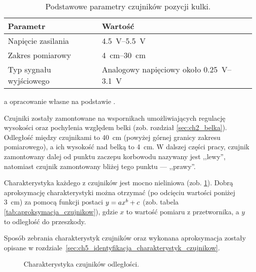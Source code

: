\begin{table}[h]
    \centering
    \begin{threeparttable}
        \caption{Podstawowe parametry czujników pozycji kulki.}
        \label{tab:parametry_czujnikow_Sharp}
        
        \begin{tabularx}{0.75\textwidth}{l | l}
            \toprule
            Parametr & Wartość \\
            \midrule
            Napięcie zasilania & \SIrange{4,5}{5,5}{\volt} \\
            Zakres pomiarowy & \SIrange{4}{30}{\centi\meter} \\
            Typ sygnału wyjściowego & Analogowy napięciowy około \SIrange{0,25}{3,1}{\volt} \\
            \bottomrule
        \end{tabularx}
        
        \begin{tablenotes}
            \footnotesize
            \item[a] opracowanie własne na podstawie \cite{SHARP_MANUAL}.
        \end{tablenotes}
    \end{threeparttable}
\end{table}

Czujniki zostały zamontowane na wspornikach umożliwiających regulację wysokości oraz pochylenia względem belki (zob. rozdział \ref{sec:ch2_belka}). Odległość między czujnikami to \SI{40}{\centi\meter} (powyżej górnej granicy zakresu pomiarowego), a ich wysokość nad belką to \SI{4}{\centi\meter}. W dalszej części pracy, czujnik zamontowany dalej od punktu zaczepu korbowodu nazywany jest ,,lewy'', natomiast czujnik zamontowany bliżej tego punktu --- ,,prawy''.

Charakterystyka każdego z czujników jest mocno nieliniowa (zob. \cref{fig:charakterystyka_czujnikow}). Dobrą aproksymację charakterystyki można otrzymać (po odcięciu wartości poniżej \SI{3}{\centi\meter}) za pomocą funkcji postaci $y =\nobreak a x ^ b + c$ (zob. tabela \ref{tab:aproksymacja_czujnikow}), gdzie $x$ to wartość pomiaru z przetwornika, a $y$ to odległość do przeszkody.

Sposób zebrania charakterystyk czujników oraz wykonana aproksymacja zostały opisane w rozdziale~\ref{sec:ch5_identyfikacja_charakterystyk_czujnikow}.

\begin{figure}[h]
    \centering
    
    \caption{Charakterystyka czujników odległości.}
    \label{fig:charakterystyka_czujnikow}
\end{figure}

